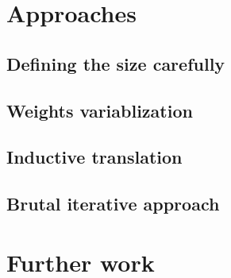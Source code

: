 \documentclass[final]{article}
\theoremstyle{definition}
\theoremstyle{remark}
\begin{document}
\section{Approaches}

\subsection{Defining the size carefully}

\subsection{Weights variablization}

\subsection{Inductive translation}

\subsection{Brutal iterative approach}

\section{Further work}

\clearpage
\end{document}
